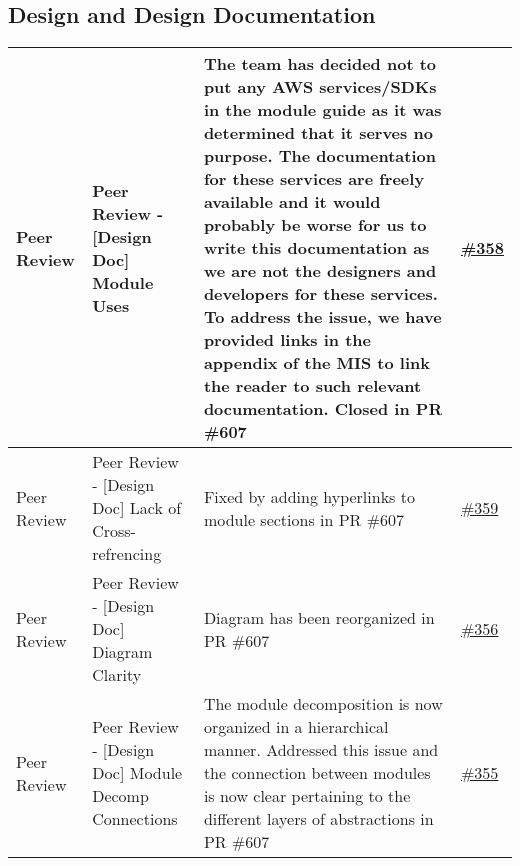 \documentclass{article}
\begin{document}
\subsection{Design and Design Documentation}
\begin{longtable}{|m{3cm}|m{3cm}|m{5cm}|m{1cm}|}
\hline
 Peer Review & Peer Review - [Design Doc] Module Uses & The team has decided not to put any AWS services/SDKs in the module guide
 as it was determined that it serves no purpose. The documentation for these services are freely available and it would probably
 be worse for us to write this documentation as we are not the designers and developers for these services. 
 To address the issue, we have provided links in the appendix of the MIS to link the reader to such relevant documentation.
 Closed in PR \#607 & \href{https://github.com/Spitgranger/SyncMaster/pull/358}{\#358}\\
 \hline
 Peer Review & Peer Review - [Design Doc] Lack of Cross-refrencing & Fixed by adding hyperlinks to module sections in PR \#607 & \href{https://github.com/Spitgranger/SyncMaster/pull/359}{\#359}\\
 \hline
 Peer Review & Peer Review - [Design Doc] Diagram Clarity & Diagram has been reorganized in PR \#607 & \href{https://github.com/Spitgranger/SyncMaster/pull/356}{\#356}\\
 \hline
 Peer Review & Peer Review - [Design Doc] Module Decomp Connections & The module decomposition is now organized in a hierarchical manner. 
 Addressed this issue and the connection between modules is now clear pertaining to the different layers of abstractions in PR \#607 
 & \href{https://github.com/Spitgranger/SyncMaster/pull/355}{\#355}\\
 \hline
\end{longtable}
\end{document}
